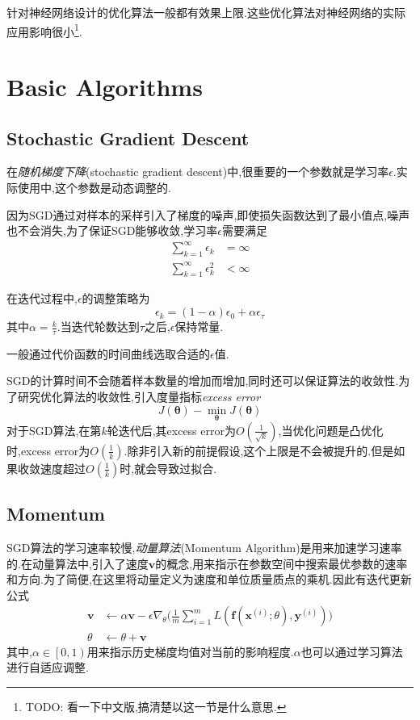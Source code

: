 针对神经网络设计的优化算法一般都有效果上限.这些优化算法对神经网络的实际应用影响很小\footnote{TODO: 看一下中文版,搞清楚以这一节是什么意思.}.

\section{Basic Algorithms}

\subsection{Stochastic Gradient Descent}

在\textit{随机梯度下降}(stochastic gradient descent)中,很重要的一个参数就是学习率$\epsilon$.实际使用中,这个参数是动态调整的.

因为SGD通过对样本的采样引入了梯度的噪声,即使损失函数达到了最小值点,噪声也不会消失,为了保证SGD能够收敛,学习率$\epsilon$需要满足
\begin{equation}\begin{split}
\sum_{k=1}^\infty\epsilon_k&=\infty\\
\sum_{k=1}^\infty\epsilon_k^2&<\infty
\end{split}\end{equation}

在迭代过程中,$\epsilon$的调整策略为
\begin{equation}
\epsilon_k=(1-\alpha)\epsilon_0+\alpha\epsilon_\tau
\end{equation}
其中$\alpha=\frac{k}{\tau}$.当迭代轮数达到$\tau$之后,$\epsilon$保持常量.

一般通过代价函数的时间曲线选取合适的$\epsilon$值.

SGD的计算时间不会随着样本数量的增加而增加,同时还可以保证算法的收敛性.为了研究优化算法的收敛性,引入度量指标\textit{excess error}
\begin{equation}
J(\mathbf\theta)-\min_{\mathbf\theta}J(\mathbf\theta)
\end{equation}
对于SGD算法,在第$k$轮迭代后,其excess error为$O(\frac{1}{\sqrt{k}})$,当优化问题是凸优化时,excess error为$O(\frac{1}{k})$.除非引入新的前提假设,这个上限是不会被提升的.但是如果收敛速度超过$O(\frac{1}{k})$时,就会导致过拟合.

\subsection{Momentum}

SGD算法的学习速率较慢,\textit{动量算法}(Momentum Algorithm)是用来加速学习速率的.在动量算法中,引入了速度$\mathbf v$的概念,用来指示在参数空间中搜索最优参数的速率和方向.为了简便,在这里将动量定义为速度和单位质量质点的乘机.因此有迭代更新公式
\begin{equation}\begin{split}
\mathbf v&\leftarrow\alpha\mathbf v-\epsilon\nabla_\theta\Big(\frac{1}{m}\sum_{i=1}^mL(\mathbf f(\mathbf x^{(i)};\theta),\mathbf y^{(i)})\Big)\\
\theta&\leftarrow\theta+\mathbf v
\end{split}\end{equation}
其中,$\alpha\in\left[0,1\right)$用来指示历史梯度均值对当前的影响程度.$\alpha$也可以通过学习算法进行自适应调整.

